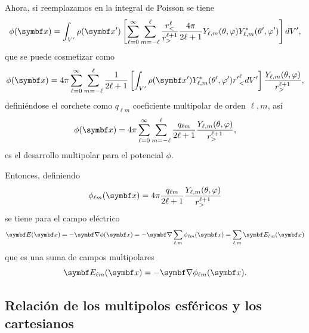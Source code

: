 \documentclass[10pt,oneside]{CBFT_book}
\begin{document}
Ahora, si reemplazamos en la integral de Poisson se tiene
\[
	\phi(\vb{x})= \int_{V'} \rho(\vb{x}')\left[ \sum_{\ell=0}^\infty \sum_{m=-\ell}^\ell 
	\frac{r_<^\ell}{r_>^{\ell+1}}\frac{4\pi}{2\ell+1} Y_{\ell,m}(\theta,\varphi) 
	Y_{\ell,m}^*(\theta',\varphi')\right] dV',
\]
que se puede cosmetizar como
\[
	\phi(\vb{x})= 4\pi \sum_{\ell=0}^\infty \sum_{m=-\ell}^\ell \frac{1}{2\ell+1} \left[
	\int_{V'} \rho(\vb{x}') Y_{\ell,m}^*(\theta',\varphi') {r'}_<^\ell dV' \right] 
	\frac{Y_{\ell,m}(\theta,\varphi) }{r_>^{\ell+1}},
\]
definiéndose el corchete como $q_{\ell m}$ coeficiente multipolar de orden $\ell,m$, así
\[
	\phi(\vb{x})= 4\pi \sum_{\ell=0}^\infty \sum_{m=-\ell}^\ell \frac{q_{\ell m}}{2\ell+1} 
	\frac{Y_{\ell,m}(\theta,\varphi) }{r_>^{\ell+1}},
\]
es el desarrollo multipolar para el potencial $\phi$.

Entonces, definiendo 
\[
	\phi_{\ell m}(\vb{x})= 
	4\pi \frac{q_{\ell m}}{2\ell+1}\frac{Y_{\ell,m}(\theta,\varphi) }{r_>^{\ell+1}}
\]
se tiene para el campo eléctrico
\[
	\vb{E}(\vb{x}) = - \Nabla \phi(\vb{x})= 
	-\Nabla \sum_{\ell,m} \phi_{\ell m}(\vb{x}) =
	\sum_{\ell,m} \vb{E}_{\ell m}(\vb{x})
\]
que es una suma de campos multipolares
\[
	\vb{E}_{\ell m}(\vb{x}) = - \Nabla \phi_{\ell m}(\vb{x}).
\]

\subsection{Relación de los multipolos esféricos y los cartesianos}
\end{document}
